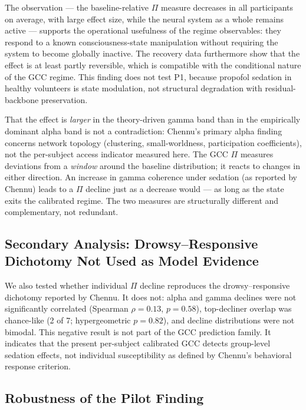 \documentclass[11pt,a4paper]{article}
\theoremstyle{plain}
\theoremstyle{definition}
\theoremstyle{remark}
\begin{document}
The observation --- the baseline-relative $\Pi$ measure decreases in all participants on average, with large effect size, while the neural system as a whole remains active --- supports the operational usefulness of the regime observables: they respond to a known consciousness-state manipulation without requiring the system to become globally inactive. The recovery data furthermore show that the effect is at least partly reversible, which is compatible with the conditional nature of the GCC regime. This finding does not test P1, because propofol sedation in healthy volunteers is state modulation, not structural degradation with residual-backbone preservation.

That the effect is \emph{larger} in the theory-driven gamma band than in the empirically dominant alpha band \citep{chennu2016} is not a contradiction: Chennu's primary alpha finding concerns network topology (clustering, small-worldness, participation coefficients), not the per-subject access indicator measured here. The GCC $\Pi$ measures deviations from a \emph{window} around the baseline distribution; it reacts to changes in either direction. An increase in gamma coherence under sedation (as reported by Chennu) leads to a $\Pi$ decline just as a decrease would --- as long as the state exits the calibrated regime. The two measures are structurally different and complementary, not redundant.

\subsection{Secondary Analysis: Drowsy--Responsive Dichotomy Not Used as Model Evidence}

We also tested whether individual $\Pi$ decline reproduces the drowsy--responsive dichotomy reported by Chennu. It does not: alpha and gamma declines were not significantly correlated (Spearman $\rho=0.13$, $p=0.58$), top-decliner overlap was chance-like (2 of 7; hypergeometric $p=0.82$), and decline distributions were not bimodal. This negative result is not part of the GCC prediction family. It indicates that the present per-subject calibrated GCC detects group-level sedation effects, not individual susceptibility as defined by Chennu's behavioral response criterion.

\subsection{Robustness of the Pilot Finding}
\end{document}
